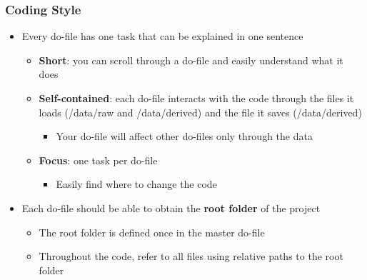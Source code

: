 \documentclass{beamer}
\begin{document}
\frame
{
	\frametitle{Coding Style}
	
	\begin{itemize}
		\item Every do-file has one task that can be explained in one sentence
		\begin{itemize}
			\item \textbf{Short}: you can scroll through a do-file and easily understand what it does
			\item \textbf{Self-contained}: each do-file interacts with the code through the files it loads (/data/raw and /data/derived) and the file it saves (/data/derived)
			\begin{itemize}
				\item Your do-file will affect other do-files only through the data
			\end{itemize}
			\item \textbf{Focus}: one task per do-file
				\begin{itemize}
				\item Easily find where to change the code
			\end{itemize}
		\end{itemize}
	\item Each do-file should be able to obtain the \textbf{root folder} of the project
	\begin{itemize}
		\item The root folder is defined once in the master do-file
		\item Throughout the code, refer to all files using relative paths to the root folder 
	\end{itemize}
	\end{itemize}	
	
}
\end{document}
